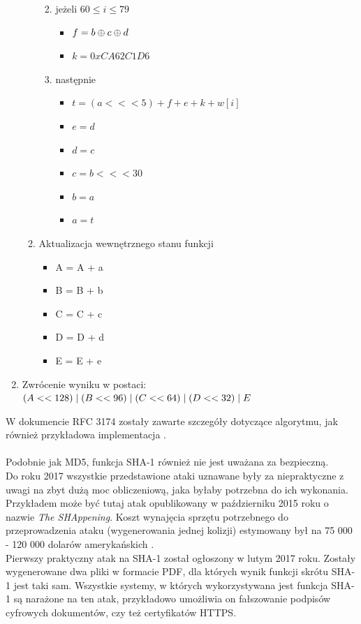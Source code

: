 \begin{enumerate}
\begin{enumerate}
\begin{enumerate}
\begin{itemize}
			            \end{itemize}
        			\item jeżeli $60 \leq i \leq 79$
        				\begin{itemize} 
				            \item $f = b \mathbin{\oplus} c \mathbin{\oplus} d$
    	        			\item $k = 0xCA62C1D6$
            			\end{itemize}
            		\item następnie
            			\begin{itemize}
            				\item $t = (a <<< 5) + f + e + k + w[i]$ 
					        \item $e = d$ 
					        \item $d = c$
					        \item $c = b <<< 30$
					        \item $b = a$ 
					        \item $a = t$ 
            			\end{itemize}
				\end{enumerate}
			\item Aktualizacja wewnętrznego stanu funkcji			
				\begin{itemize}
					\item A = A + a
					\item B = B + b
					\item C = C + c
					\item D = D + d
					\item E = E + e
				\end{itemize}
		\end{enumerate}
	\item Zwrócenie wyniku w postaci: \\
		$(A << 128) \mathrel{|} (B << 96) \mathrel{|} (C << 64) \mathrel{|} (D << 32) \mathrel{|} E$
\end{enumerate}
W dokumencie RFC 3174 zostały zawarte szczegóły dotyczące algorytmu, jak również przykładowa implementacja \cite{sha1rfc}. \\ \\
Podobnie jak MD5, funkcja SHA-1 również nie jest uważana za bezpieczną. \\
Do roku 2017 wszystkie przedstawione ataki uznawane były za niepraktyczne z uwagi na zbyt dużą moc obliczeniową, jaka byłaby potrzebna do ich wykonania.
Przykładem może być tutaj atak opublikowany w październiku 2015 roku o nazwie \textit{The SHAppening}. Koszt wynajęcia sprzętu potrzebnego do przeprowadzenia ataku (wygenerowania jednej kolizji) estymowany był na 75 000 - 120 000 dolarów amerykańskich \cite{shap}. \\
Pierwszy praktyczny atak na SHA-1 został ogłoszony w lutym 2017 roku. Zostały wygenerowane dwa pliki w formacie PDF, dla których wynik funkcji skrótu SHA-1 jest taki sam. Wszystkie systemy, w których wykorzystywana jest funkcja SHA-1 są narażone na ten atak, przykładowo umożliwia on fałszowanie podpisów cyfrowych dokumentów, czy też certyfikatów HTTPS. \cite{shatt}

